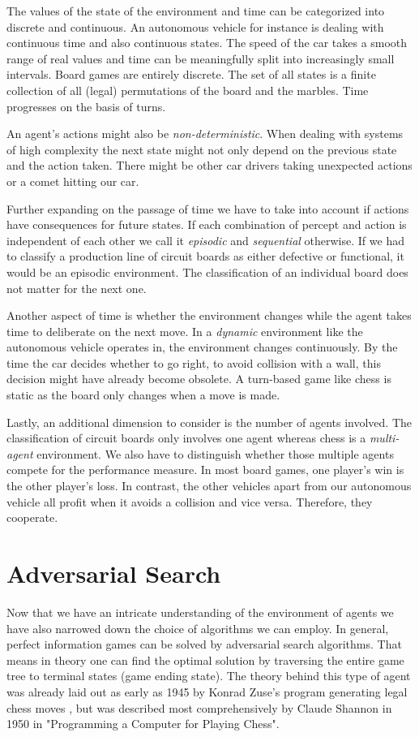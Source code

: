The values of the state of the environment and time can be categorized into discrete and continuous. An autonomous vehicle for instance is dealing with continuous time and also continuous states. The speed of the car takes a smooth range of real values and time can be meaningfully split into increasingly small intervals. Board games are entirely discrete. The set of all states is a finite collection of all (legal) permutations of the board and the marbles. Time progresses on the basis of turns.

An agent's actions might also be \textit{non-deterministic}. When dealing with systems of high complexity the next state might not only depend on the previous state and the action taken. There might be other car drivers taking unexpected actions or a comet hitting our car.

Further expanding on the passage of time we have to take into account if actions have consequences for future states. If each combination of percept and action is independent of each other we call it \textit{episodic} and \textit{sequential} otherwise. If we had to classify a production line of circuit boards as either defective or functional, it would be an episodic environment. The classification of an individual board does not matter for the next one.

Another aspect of time is whether the environment changes while the agent takes time to deliberate on the next move. In a \textit{dynamic} environment like the autonomous vehicle operates in, the environment changes continuously. By the time the car decides whether to go right, to avoid collision with a wall, this decision might have already become obsolete. A  turn-based game like chess is static as the board only changes when a move is made.

Lastly, an additional dimension to consider is the number of agents involved. The classification of circuit boards only involves one agent whereas chess is a \textit{multi-agent} environment. We also have to distinguish whether those multiple agents compete for the performance measure. In most board games, one player's win is the other player's loss. In contrast, the other vehicles apart from our autonomous vehicle all profit when it avoids a collision and vice versa. Therefore, they cooperate.



\section{Adversarial Search}
Now that we have an intricate understanding of the environment of agents we have also narrowed down the choice of algorithms we can employ. In general, perfect information games can be solved by adversarial search algorithms. That means in theory one can find the optimal solution by traversing the entire game tree to terminal states (game ending state). The theory behind this type of agent was already laid out as early as 1945 by Konrad Zuse's program generating legal chess moves \cite{knuth_early_1980}, but was described most comprehensively by Claude Shannon in 1950 in "Programming a Computer for Playing Chess". \cite{shannon_xxii_1950}

